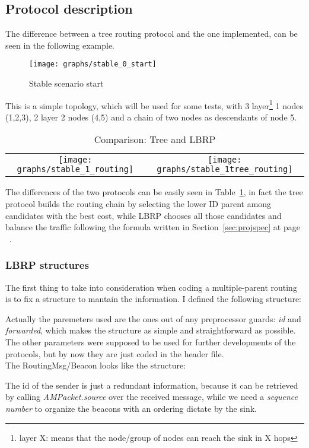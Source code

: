 \documentclass{article}
\begin{document}
	\subsection{Protocol description}
The difference between a tree routing protocol and the one implemented, can be seen in the following example.
		\begin{figure}[H]
			\begin{center}
				\texttt{[image: graphs/stable\_0\_start]}
				\caption{Stable scenario start}
				\label{fig:stableStart}
			\end{center}
		\end{figure}
This is a simple topology, which will be used for some tests, with 3 layer\footnote{layer X: means that the node/group of nodes can reach the sink in X hops} 1 nodes (1,2,3), 2 layer 2 nodes (4,5) and a chain of two nodes as descendants of node 5.
		\begin{table}[H]
			\centering
			\begin{tabular}{cc}
				\texttt{[image: graphs/stable\_1\_routing]}&\texttt{[image: graphs/stable\_1tree\_routing]}\\
			\end{tabular}
			\caption{Comparison: Tree and LBRP}
			\label{tab:comparisonProto}
		\end{table}
The differences of the two protocols can be easily seen in Table~\ref{tab:comparisonProto}, in fact the tree protocol builds the routing chain by selecting the lower ID parent among candidates with the best cost, while LBRP chooses all those candidates and balance the traffic following the formula written in Section~\ref{sec:projspec} at page ~\pageref{sec:projspec}.
\clearpage
	\subsubsection{LBRP structures}
The first thing to take into consideration when coding a multiple-parent routing is to fix a structure to mantain the information. I defined the following structure:

Actually the paremeters used are the ones out of any preprocessor guards: \textit{id} and \textit{forwarded}, which makes the structure as simple and straightforward as possible. The other parameters were supposed to be used for further developments of the protocols, but by now they are just coded in the header file.
\\The RoutingMsg/Beacon looks like the structure:

The id of the sender is just a redundant information, because it can be retrieved by calling \textit{AMPacket.source} over the received message, while we need a \textit{sequence number} to organize the beacons with an ordering dictate by the sink.
\clearpage
\end{document}
